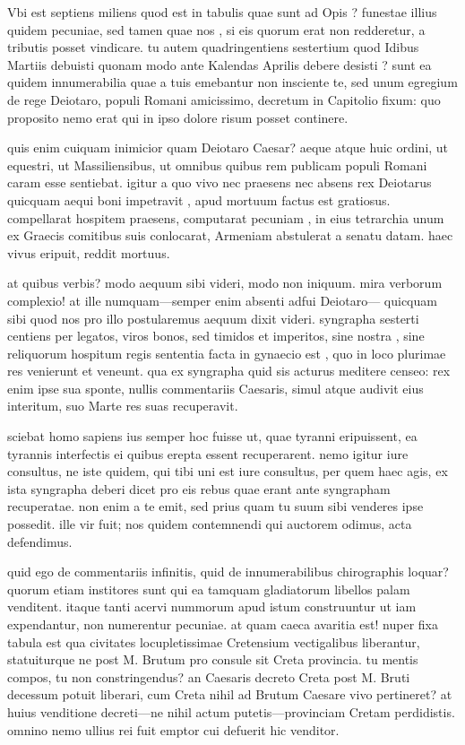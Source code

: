  Vbi est septiens miliens quod est in tabulis quae sunt ad Opis ? funestae illius quidem pecuniae, sed tamen quae nos , si eis quorum erat non redderetur, a tributis posset vindicare. tu autem quadringentiens sestertium quod Idibus Martiis debuisti quonam modo ante Kalendas Aprilis debere desisti ? sunt ea quidem innumerabilia quae a tuis emebantur non insciente te, sed unum egregium de rege Deiotaro, populi Romani amicissimo, decretum in Capitolio fixum: quo proposito nemo erat qui in ipso dolore risum posset continere.

 quis enim cuiquam inimicior quam Deiotaro Caesar? aeque atque huic ordini, ut equestri, ut Massiliensibus, ut omnibus quibus rem publicam populi Romani caram esse sentiebat. igitur a quo vivo nec praesens nec absens rex Deiotarus quicquam aequi boni impetravit , apud mortuum factus est gratiosus. compellarat hospitem praesens, computarat pecuniam , in eius tetrarchia unum ex Graecis comitibus suis conlocarat, Armeniam abstulerat a senatu datam. haec vivus eripuit, reddit mortuus.

 at quibus verbis? modo aequum sibi videri, modo non iniquum. mira verborum complexio! at ille numquam—semper enim absenti adfui Deiotaro— quicquam sibi quod nos pro illo postularemus aequum dixit videri. syngrapha sesterti centiens per legatos, viros bonos, sed timidos et imperitos, sine nostra , sine reliquorum hospitum regis sententia facta in gynaecio est , quo in loco plurimae res venierunt et veneunt. qua ex syngrapha quid sis acturus meditere censeo: rex enim ipse sua sponte, nullis commentariis Caesaris, simul atque audivit eius interitum, suo Marte res suas recuperavit.

 sciebat homo sapiens ius semper hoc fuisse ut, quae tyranni eripuissent, ea tyrannis interfectis ei quibus erepta essent recuperarent. nemo igitur iure consultus, ne iste quidem, qui tibi uni est iure consultus, per quem haec agis, ex ista syngrapha deberi dicet pro eis rebus quae erant ante syngrapham recuperatae. non enim a te emit, sed prius quam tu suum sibi venderes ipse possedit. ille vir fuit; nos quidem contemnendi qui auctorem odimus, acta defendimus.

 quid ego de commentariis infinitis, quid de innumerabilibus chirographis loquar? quorum etiam institores sunt qui ea tamquam gladiatorum libellos palam venditent. itaque tanti acervi nummorum apud istum construuntur ut iam expendantur, non numerentur pecuniae. at quam caeca avaritia est! nuper fixa tabula est qua civitates locupletissimae Cretensium vectigalibus liberantur, statuiturque ne post M. Brutum pro consule sit Creta provincia. tu mentis compos, tu non constringendus? an Caesaris decreto Creta post M. Bruti decessum potuit liberari, cum Creta nihil ad Brutum Caesare vivo pertineret? at huius venditione decreti—ne nihil actum putetis—provinciam Cretam perdidistis. omnino nemo ullius rei fuit emptor cui defuerit hic venditor.

